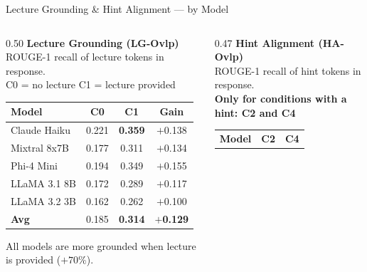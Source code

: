 \documentclass[aspectratio=169]{beamer}
\begin{document}
\begin{frame}{Lecture Grounding \& Hint Alignment --- by Model}
\vspace{0.05cm}
\begin{columns}[T]
  \begin{column}{0.50\textwidth}
    \small\textbf{Lecture Grounding (LG-Ovlp)}\\
    {\footnotesize ROUGE-1 recall of lecture tokens in response.\\
    C0 = no lecture \quad C1 = lecture provided}
    \vspace{0.08cm}
    \begin{center}
    \renewcommand{\arraystretch}{1.2}
    \scriptsize
    \begin{tabular}{lccc}
      \toprule
      \textbf{Model} & \textbf{C0} & \textbf{C1} & \textbf{Gain}\\
      \midrule
      Claude Haiku  & 0.221 & \cellcolor{custompurple!20}\textbf{0.359} & $+$0.138\\
      Mixtral 8x7B  & 0.177 & \cellcolor{custompurple!15}0.311 & $+$0.134\\
      Phi-4 Mini    & 0.194 & \cellcolor{custompurple!15}0.349 & $+$0.155\\
      LLaMA 3.1 8B  & 0.172 & 0.289 & $+$0.117\\
      LLaMA 3.2 3B  & 0.162 & 0.262 & $+$0.100\\
      \midrule
      \textbf{Avg}  & 0.185 & \textbf{0.314} & \textbf{$+$0.129}\\
      \bottomrule
    \end{tabular}
    \end{center}
    \vspace{0.05cm}
    {\footnotesize All models are more grounded when lecture is provided ($+70\%$).}
  \end{column}
  \begin{column}{0.47\textwidth}
    \small\textbf{Hint Alignment (HA-Ovlp)}\\
    {\footnotesize ROUGE-1 recall of hint tokens in response.\\
    \textbf{Only for conditions with a hint: C2 and C4}}
    \vspace{0.08cm}
    \begin{center}
    \renewcommand{\arraystretch}{1.2}
    \scriptsize
    \begin{tabular}{lcc}
      \toprule
      \textbf{Model} & \textbf{C2} & \textbf{C4}\\

\end{tabular}
\end{center}
\end{column}
\end{columns}
\end{frame}
\end{document}
